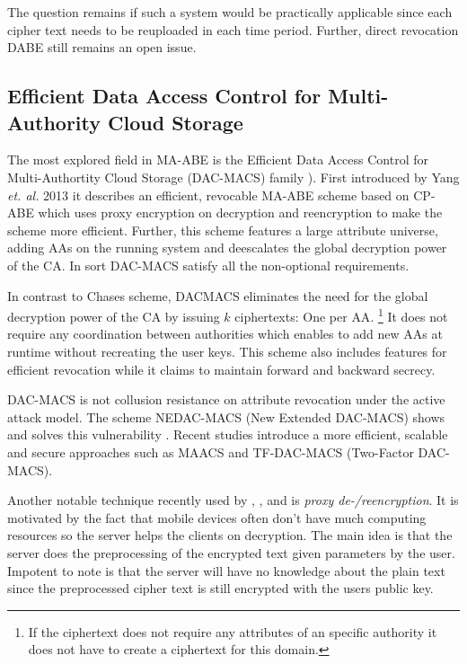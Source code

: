 The question remains if such a system would be practically applicable since each cipher text needs to be reuploaded in each time period. Further, direct revocation DABE still remains an open issue.

\subsection{Efficient Data Access Control for Multi-Authority Cloud Storage}
The most explored field in \ac{MA-ABE} is the Efficient Data Access Control for Multi-Authortity Cloud Storage (\ac{DAC-MACS}) family \cite{yang2013dac}). First introduced by Yang \textit{et. al.} 2013 it describes an efficient, revocable \ac{MA-ABE} scheme based on \ac{CP-ABE} which uses proxy encryption on decryption and reencryption to make the scheme more efficient. Further, this scheme features a large attribute universe, adding \ac{AA}s on the running system and deescalates the global decryption power of the \ac{CA}. In sort \ac{DAC-MACS} satisfy all the non-optional requirements.

In contrast to Chases scheme, DACMACS eliminates the need for the global decryption power of the \ac{CA} by issuing $k$ ciphertexts: One per \ac{AA}. \footnote{If the ciphertext does not require any attributes of an specific authority it does not have to create a ciphertext for this domain.} It does not require any coordination between authorities which enables to add new \ac{AA}s at runtime without recreating the user keys. This scheme also includes features for efficient revocation while it claims to maintain forward and backward secrecy.

\ac{DAC-MACS} is not collusion resistance on attribute revocation under the active attack model. The scheme \ac{NEDAC-MACS} (New Extended \ac{DAC-MACS}) shows and solves this vulnerability \cite{wu2017security}. Recent studies introduce a more efficient, scalable and secure approaches such as \ac{MAACS} \cite{li2016secure} and \ac{TF-DAC-MACS} (Two-Factor \ac{DAC-MACS})\cite{li2017two}. 

Another notable technique recently used by \cite{yang2013dac}, \cite{wu2017security}, \cite{li2017two} and \cite{wang2011hierarchical} is \textit{proxy de-/reencryption}. It is motivated by the fact that mobile devices often don't have much computing resources so the server helps the clients on decryption. The main idea is that the server does the preprocessing of the encrypted text given parameters by the user. Impotent to note is that the server will have no knowledge about the plain text since the preprocessed cipher text is still encrypted with the users public key. 

